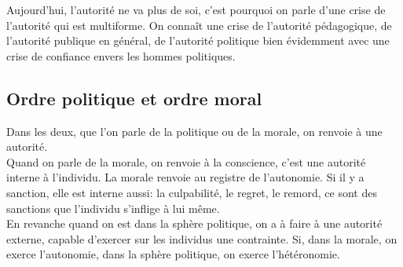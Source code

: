 \documentclass[10pt, a4paper, openany]{book}
\begin{document}
Aujourd'hui, l'autorité ne va plus de soi, c'est pourquoi on parle d'une crise de l'autorité qui est multiforme. On connaît une crise de l'autorité pédagogique, de l'autorité publique en général, de l'autorité politique bien évidemment avec une crise de confiance envers les hommes politiques. 

\subsection{Ordre politique et ordre moral}

Dans les deux, que l'on parle de la politique ou de la morale, on renvoie à une autorité. \\
Quand on parle de la morale, on renvoie à la conscience, c'est une autorité interne à l'individu. La morale renvoie au registre de l'autonomie. Si il y a sanction, elle est interne aussi: la culpabilité, le regret, le remord, ce sont des sanctions que l'individu s'inflige à lui même. \\
En revanche quand on est dans la sphère politique, on a à faire à une autorité externe, capable d'exercer sur les individus une contrainte. Si, dans la morale, on exerce l'autonomie, dans la sphère politique, on exerce l'hétéronomie.
\end{document}
